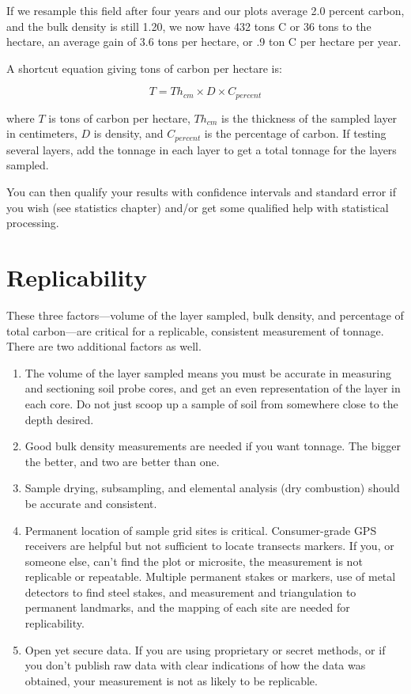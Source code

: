 \documentclass[11pt,letterpaper,oneside,onecolumn]{memoir}
\begin{document}
If we resample this field after four years and our plots average 2.0 percent carbon, and the bulk density is still 1.20, we now have 432 tons C or 36 tons to the hectare, an average gain of 3.6 tons per hectare, or .9 ton C per hectare per year.

A shortcut equation giving tons of carbon per hectare is:

\begin{equation}T=Th_{cm} \times D \times C_{percent}\end{equation}

\noindent where $T$ is tons of carbon per hectare, $Th_{cm}$ is the thickness of the sampled layer in centimeters, $D$ is density, and $C_{percent}$ is the percentage of carbon. If testing several layers, add the tonnage in each layer to get a total tonnage for the layers sampled.

You can then qualify your results with confidence intervals and standard error if you wish (see statistics chapter) and/or get some qualified help with statistical processing.

\section{Replicability}

These three factors---volume of the layer sampled, bulk density, and percentage of total carbon---are critical for a replicable, consistent measurement of tonnage. There are two additional factors as well.

\begin{enumerate}

\item The volume of the layer sampled means you must be accurate in measuring and sectioning soil probe cores, and get an even representation of the layer in each core. Do not just scoop up a sample of soil from somewhere close to the depth desired.

\item Good bulk density measurements are needed if you want tonnage. The bigger the better, and two are better than one.

\item Sample drying, subsampling, and elemental analysis (dry combustion) should be accurate and consistent.

\item Permanent location of sample grid sites is critical. Consumer-grade GPS receivers are helpful but not sufficient to locate transects markers. If you, or someone else, can't find the plot or microsite, the measurement is not replicable or repeatable. Multiple permanent stakes or markers, use of metal detectors to find steel stakes, and measurement and triangulation to permanent landmarks, and the mapping of each site are needed for replicability.

\item Open yet secure data. If you are using proprietary or secret methods, or if you don't publish raw data with clear indications of how the data was obtained, your measurement is not as likely to be replicable.
\end{enumerate}
\end{document}
